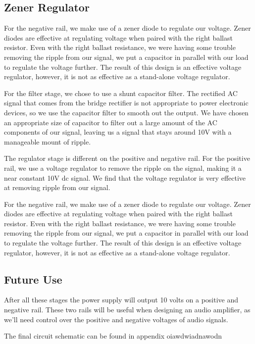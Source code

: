 \documentclass[12pt]{article}
\begin{document}
\subsection{Zener Regulator}
For the negative rail, we make use of a zener diode to regulate our voltage. Zener diodes are effective at regulating voltage when paired with the right ballast resistor. Even 
with the right ballast resistance, we were having some trouble removing the ripple from our signal, we put a capacitor in parallel with our load to regulate the voltage further. 
The result of this design is an effective voltage regulator, however, it is not as effective as a stand-alone voltage regulator.

For the filter stage, we chose to use a shunt capacitor filter. The rectified AC signal that comes from the bridge rectifier is not appropriate to power electronic devices, so we use the capacitor filter to smooth out the output. We have chosen 
an appropriate size of capacitor to filter out a large amount of the AC components of our signal, leaving us a signal that stays around 10V with a manageable mount of ripple.

The regulator stage is different on the positive and negative rail. For the positive rail, we use a voltage regulator to remove the ripple on the signal, making it a near constant 10V dc signal. We find that the voltage regulator is very effective at removing 
ripple from our signal.

For the negative rail, we make use of a zener diode to regulate our voltage. Zener diodes are effective at regulating voltage when paired with the right ballast resistor. Even with the right ballast resistance, we were having some trouble removing the ripple from our signal, 
we put a capacitor in parallel with our load to regulate the voltage further. The result of this design is an effective voltage regulator, however, it is not as effective as a stand-alone voltage regulator.

\subsection{Future Use}
After all these stages the power supply will output 10 volts on a positive and negative rail. These two rails will be useful when designing an audio amplifier, as we'll need control over the 
positive and negative voltages of audio signals.


The final circuit schematic can be found in appendix oiawdwiadnawodn
\end{document}
